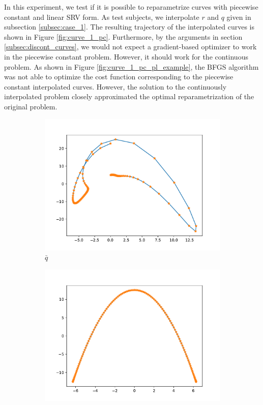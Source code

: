 In this experiment, we test if it is possible to reparametrize curves with piecewise constant and linear SRV form. As test subjects, we interpolate \(r\) and \(q\) given in subsection \ref{subsec:case_1}. The resulting trajectory of the interpolated curves is shown in Figure \ref{fig:curve_1_pc}. Furthermore, by the arguments in section \ref{subsec:discont_curves}, we would not expect a gradient-based optimizer to work in the piecewise constant problem. However, it should work for the continuous problem. As shown in Figure \ref{fig:curve_1_pc_pl_example}, the BFGS algorithm was not able to optimize the cost function corresponding to the piecewise constant interpolated curves. However, the solution to the continuously interpolated problem closely approximated the optimal reparametrization of the original problem. 
\begin{figure}[b]
    \begin{subfigure}[t]{0.5\textwidth}
        \centering
        \includegraphics[width=\linewidth]{figures/curve_1_pc/curve_q_pc.pdf}
        \caption{\(\bar q\)}\label{fig:curve_1_pc_q}
    \end{subfigure}
    \begin{subfigure}[t]{0.5\textwidth}
        \centering
        \includegraphics[width=\linewidth]{figures/curve_1_pc/curve_r_pc.pdf}

\end{subfigure}
\end{figure}
